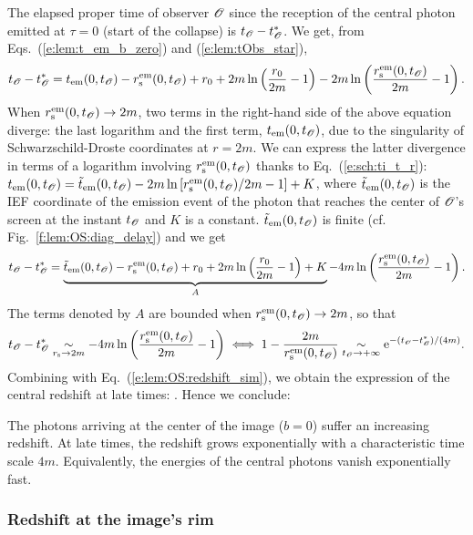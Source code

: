 The elapsed proper time of observer $\mathscr{O}$
since the reception of the central photon emitted
at $\tau = 0$ (start of the collapse) is $t_{\mathscr{O}} - t_{\mathscr{O}}^*$.
We get, from Eqs.~(\ref{e:lem:t_em_b_zero}) and (\ref{e:lem:tObs_star}),
\[
    t_{\mathscr{O}} - t_{\mathscr{O}}^* =  t_{\rm em}(0, t_{\mathscr{O}}) - r_{\rm s}^{\rm em}(0,t_{\mathscr{O}}) + r_0
        + 2m \ln\left(\frac{r_0}{2m} - 1 \right)
        - 2m \ln\left(\frac{r_{\rm s}^{\rm em}(0,t_{\mathscr{O}})}{2m} - 1 \right) .
\]
When $r_{\rm s}^{\rm em}(0,t_{\mathscr{O}}) \to 2m$, two terms in the right-hand side
of the above equation diverge: the last logarithm and the first term,
$t_{\rm em}(0, t_{\mathscr{O}})$, due to the singularity of Schwarzschild-Droste coordinates
at $r=2m$. We can express the latter divergence in terms of a logarithm
involving $r_{\rm s}^{\rm em}(0,t_{\mathscr{O}})$ thanks to Eq.~(\ref{e:sch:ti_t_r}):
$t_{\rm em}(0, t_{\mathscr{O}}) = {\tilde t}_{\rm em}(0,t_{\mathscr{O}}) - 2m
\ln\left[ {r_{\rm s}^{\rm em}(0,t_{\mathscr{O}})}/{2m}  - 1 \right] + K$,
where ${\tilde t}_{\rm em}(0,t_{\mathscr{O}})$ is the IEF coordinate
of the emission event of the photon that reaches the center of $\mathscr{O}$'s screen
at the instant $t_{\mathscr{O}}$
and $K$ is a constant.
${\tilde t}_{\rm em}(0,t_{\mathscr{O}})$ is finite (cf. Fig.~\ref{f:lem:OS:diag_delay})
and we get
\[
    t_{\mathscr{O}} - t_{\mathscr{O}}^* = \underbrace{{\tilde t}_{\rm em}(0,t_{\mathscr{O}}) - r_{\rm s}^{\rm em}(0,t_{\mathscr{O}}) + r_0
    + 2 m \ln \left( \frac{r_0}{2m} - 1 \right) + K}_{A}
    -  4 m \ln \left( \frac{r_{\rm s}^{\rm em}(0,t_{\mathscr{O}})}{2 m}  - 1 \right) .
\]
The terms denoted by $A$ are bounded when $r_{\rm s}^{\rm em}(0,t_{\mathscr{O}}) \to 2m$, so that
\[
    t_{\mathscr{O}} - t_{\mathscr{O}}^*  \underset{r_{\rm s}\to 2m}{\sim} -  4 m \ln \left( \frac{r_{\rm s}^{\rm em}(0,t_{\mathscr{O}})}{2 m}  - 1 \right)
    \iff 1 - \frac{2m}{r_{\rm s}^{\rm em}(0,t_{\mathscr{O}})}
    \underset{t_{\mathscr{O}} \to +\infty}{\sim} \mathrm{e}^{-(t_{\mathscr{O}} - t_{\mathscr{O}}^*)/(4 m)} .
\]
Combining with Eq.~(\ref{e:lem:OS:redshift_sim}), we obtain the expression
of the central redshift at late times:
\be \label{e:lem:central_redshift}
    .
\ee
Hence we conclude:
\begin{prop}
The photons arriving at the center of the image ($b=0$) suffer an
increasing redshift. At late times, the redshift grows exponentially
with a characteristic time scale $4 m$. Equivalently, the energies of the central photons
vanish exponentially fast.
\end{prop}

\subsubsection{Redshift at the image's rim}

